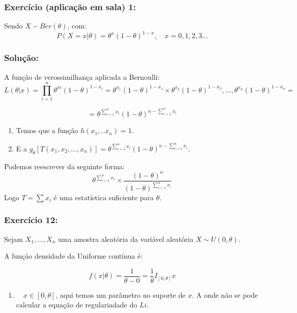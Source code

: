 \documentclass[
  letterpaper,
  DIV=11,
  numbers=noendperiod]{scrartcl}
\providecommand{\tightlist}{%
  \setlength{\itemsep}{0pt}\setlength{\parskip}{0pt}}\usepackage{longtable,booktabs,array}
\begin{document}
\subsubsection{Exercício (aplicação em sala)
1:}\label{exercuxedcio-aplicauxe7uxe3o-em-sala-1}

Sendo \(X\) \textasciitilde{} \(Ber(\theta)\), com: \[
P(X=x| \theta)=\theta^x(1-\theta)^{1-x}, \quad x = 0,1,2,3...
\]

\subsubsection{Solução:}\label{soluuxe7uxe3o}

A função de verossimilhança aplicada a Bernoulli: \[
L(\theta|x) = \prod_{i=1}^{n} \theta^{xi}(1-\theta)^{1-x_i} = \theta^{x_1}(1-\theta)^{1-x_1}\times\theta^{x_2}(1-\theta)^{1-x_2},...,\theta^{x_n}(1-\theta)^{1-x_n} =
\]

\[
= \theta^{\sum_{i=1}^{n}x_i}(1-\theta)^{n-\sum_{i=1}^{n}x_i}
\]

\begin{enumerate}
\def\labelenumi{\arabic{enumi}.}
\tightlist
\item
  Temos que a função \(h(x_1,..x_n) = 1\).
\item
  E a
  \(g_\theta[T(x_1,x_2,...,x_n)]= \theta^{\sum_{i=1}^{n}x_i}(1-\theta)^{n-\sum_{i=1}^{n}x_i}\).
\end{enumerate}

Podemos reescrever da seguinte forma: \[
\theta^{\sum_{i=1}^{n}x_i} \times \frac{(1-\theta)^{n}}{(1-\theta)^{\sum_{i=1}^{n}x_i}}
\] Logo \(T=\sum{x_i}\) é uma estatística suficiente para \(\theta\).

\subsubsection{Exercício 12:}\label{exercuxedcio-12}

Sejam \(X_1,...,X_n\) uma amostra aleatória da variável aleatória
\(X ∼ U(0, θ)\).

A função densidade da Uniforme contínua é:

\[
f(x|\theta)= \frac{1}{\theta-0}=\frac{1}{\theta}I_{[0,\theta]}x
\]

\begin{enumerate}
\def\labelenumi{\arabic{enumi}.}
\tightlist
\item
  \(\quad x \in [0,\theta]\), aqui temos um parâmetro no suporte de
  \(x\). A onde não se pode calcular a equação de regulariadade do
  \(Li\).
\end{enumerate}
\end{document}
